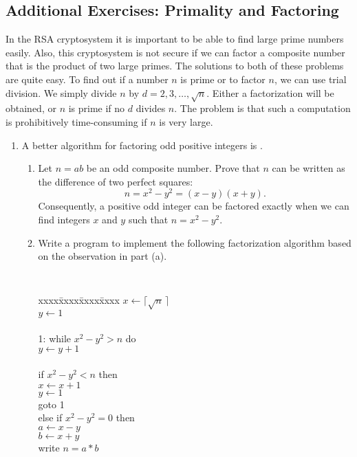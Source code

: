  
\subsection*{Additional Exercises: Primality and Factoring}
 
{\small 
 
 
In the RSA cryptosystem it is important to be able to find
large prime numbers easily.  Also, this cryptosystem is not secure if we
can factor a composite number that is the product of two large primes.
The solutions to both of these problems are quite easy.  To
find out if a number $n$ is prime or to factor $n$, we can use trial
division. We simply divide $n$ by $d = 2, 3, \ldots, \sqrt{n}$.
Either a factorization will be obtained, or $n$ is prime if no $d$
divides $n$.  The problem is that such a computation is prohibitively
time-consuming if $n$ is very large. 
\begin{enumerate}
 
 
\bf\item\rm
A better algorithm for factoring odd positive integers is . 
\begin{enumerate}
 
\bf\item\rm
Let $n= ab$ be an odd composite number. Prove that $n$ can be written
as the difference of two perfect squares:
$$
n = x^2 - y^2 = (x-y)(x+y).
$$
Consequently, a positive odd integer can be factored exactly when we
can find integers $x$ and $y$ such that $n = x^2 - y^2$.
 
\bf\item\rm
Write a program to implement the following factorization algorithm
based on the observation in part (a).
 
\vspace{1ex}
 
{\tt
\begin{tabbing}
xxxx\=xxxx\=xxxx\=xxxx \kill
\> $x \leftarrow \lceil \sqrt{n}\, \rceil$ \\
\> $y \leftarrow 1$ \\
\mbox{\hspace*{1in}} \\
1: \> while $x^2 - y^2 > n$ do \\
\> \> $y \leftarrow y + 1$ \\
\mbox{\hspace*{1in}} \\
\> if $x^2 - y^2 < n$ then \\
\> \>  $x \leftarrow x + 1$ \\
\> \>  $y \leftarrow 1$ \\
\> \>  goto 1 \\
\> else if $x^2 - y^2 = 0$ then \\
\>  \> $a \leftarrow x-y$ \\
\>  \> $b \leftarrow x+y$ \\
\>  \> write $n = a * b$ 
\end{tabbing}
 
}
\end{enumerate}
\end{enumerate}}
